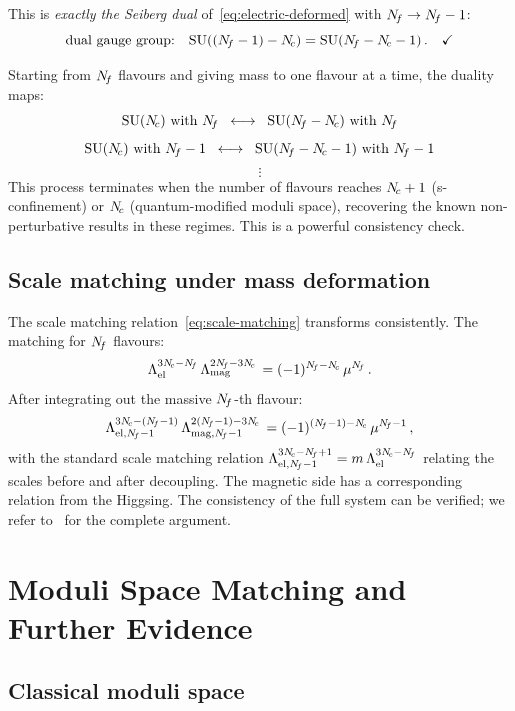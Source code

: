 \documentclass[11pt,a4paper]{article}
\begin{document}
This is \emph{exactly the Seiberg dual} of~\eqref{eq:electric-deformed} with
$N_{\!f} \to N_{\!f} - 1$:
\[
  \text{dual gauge group:}\quad \mathrm{SU}((N_{\!f} - 1) - N_{\!c})
  = \mathrm{SU}(N_{\!f} - N_{\!c} - 1)\,. \quad\checkmark
\]

\begin{remark}
  Starting from $N_{\!f}$ flavours and giving mass to one flavour at a time, the
  duality maps:
  \[
    \mathrm{SU}(N_{\!c}) \text{ with } N_{\!f}
    \;\;\longleftrightarrow\;\;
    \mathrm{SU}(N_{\!f} - N_{\!c}) \text{ with } N_{\!f}
  \]
  \[
    \mathrm{SU}(N_{\!c}) \text{ with } N_{\!f} - 1
    \;\;\longleftrightarrow\;\;
    \mathrm{SU}(N_{\!f} - N_{\!c} - 1) \text{ with } N_{\!f} - 1
  \]
  \[
    \vdots
  \]
  This process terminates when the number of flavours reaches $N_{\!c} + 1$
  (s-confinement) or $N_{\!c}$ (quantum-modified moduli space), recovering the
  known non-perturbative results in these regimes.  This is a powerful
  consistency check.
\end{remark}

\subsection{Scale matching under mass deformation}

The scale matching relation~\eqref{eq:scale-matching} transforms consistently.
The matching for $N_{\!f}$ flavours:
\[
  \Lambda_{\text{el}}^{3N_{\!c} - N_{\!f}}\,
  \Lambda_{\text{mag}}^{2N_{\!f} - 3N_{\!c}}\,
  = (-1)^{N_{\!f} - N_{\!c}}\, \mu^{N_{\!f}}\,.
\]
After integrating out the massive $N_{\!f}$-th flavour:
\[
  \Lambda_{\text{el},\Nf-1}^{3\Nc - (\Nf-1)}\,
  \Lambda_{\text{mag},\Nf-1}^{2(\Nf-1) - 3\Nc}\,
  = (-1)^{(\Nf-1) - \Nc}\, \mu^{\Nf-1}\,,
\]
with the standard scale matching relation
$\Lambda_{\text{el},N_{\!f}-1}^{3N_{\!c} - N_{\!f} + 1} = m\,
\Lambda_{\text{el}}^{3N_{\!c} - N_{\!f}}$ relating the scales before and after
decoupling.  The magnetic side has a corresponding relation from the Higgsing.
The consistency of the full system can be verified; we refer to~\cite{Seiberg1995} for the complete argument.


\section{Moduli Space Matching and Further Evidence}
\label{sec:moduli-space}

\subsection{Classical moduli space}
\end{document}
